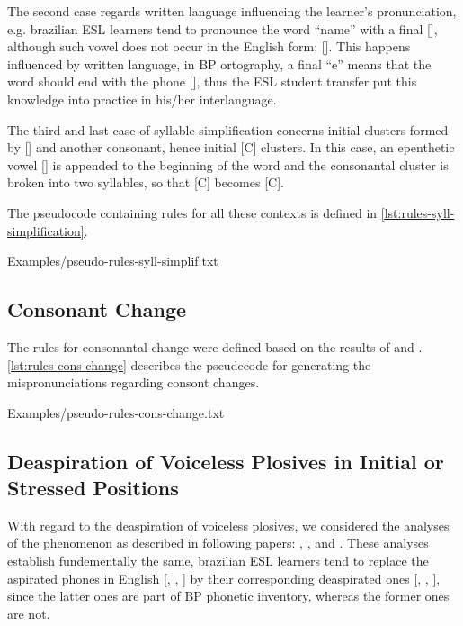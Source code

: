 The second case regards written language
influencing the learner's pronunciation, e.g. brazilian \ac{ESL} learners tend to pronounce the word ``name'' with a final 
[], although such vowel does not occur in the English form: []. This happens influenced by written language,
in \ac{BP} ortography, a final ``e'' means that the word should end with the phone [], thus the \ac{ESL} student
transfer put this knowledge into practice in his/her interlanguage. 

The third and last case of syllable simplification concerns initial clusters formed
by [] and another consonant, hence initial [C] clusters. In this case, an epenthetic vowel [] is appended to the
beginning of the word and the consonantal cluster is broken into two syllables, so that [C] becomes [C].

The pseudocode containing rules for all these contexts is defined in \autoref{lst:rules-syll-simplification}.

%
    {Examples/pseudo-rules-syll-simplif.txt}

\subsection{Consonant Change}\label{sec:consonant-change}
The rules for consonantal change were defined based on the results of
\citeauthor{Reis2006} \citep{Reis2006} and \citeauthor{Trevisol2010} \citep{Trevisol2010}.
\autoref{lst:rules-cons-change} describes the pseudecode for generating the mispronunciations regarding consont changes.

%
    {Examples/pseudo-rules-cons-change.txt}
    
\subsection{Deaspiration of Voiceless Plosives in Initial or Stressed Positions}

With regard to the deaspiration of voiceless plosives, we considered the analyses of the phenomenon as described in following papers: 
\citeauthor{Alves2008} \citep{Alves2008}, \citeauthor{Prestes2012} \citep{Prestes2012}, 
\citeauthor{Scwartzhaupt2014} \citep{Scwartzhaupt2014} and \citeauthor{Zimmer2006} \citep{Zimmer2006}. These analyses establish 
fundementally the same, brazilian \ac{ESL} learners tend to replace the aspirated phones in English 
[, , ] by their corresponding deaspirated ones 
[, , ], since the latter ones are part of \ac{BP} phonetic inventory, whereas the former ones are not. 

